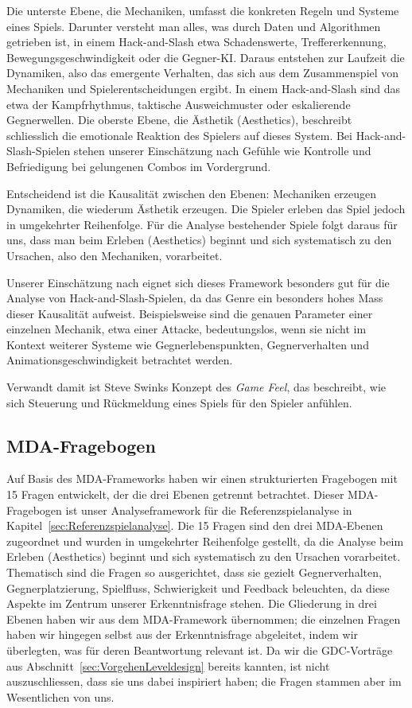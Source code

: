 \documentclass[../Main.tex]{subfiles}
\begin{document}
Die unterste Ebene, die Mechaniken, umfasst die konkreten Regeln und Systeme eines Spiels. Darunter versteht man alles, was durch Daten und Algorithmen getrieben ist, in einem Hack-and-Slash etwa Schadenswerte, Treffererkennung, Bewegungsgeschwindigkeit oder die Gegner-KI. Daraus entstehen zur Laufzeit die Dynamiken, also das emergente Verhalten, das sich aus dem Zusammenspiel von Mechaniken und Spielerentscheidungen ergibt. In einem Hack-and-Slash sind das etwa der Kampfrhythmus, taktische Ausweichmuster oder eskalierende Gegnerwellen. Die oberste Ebene, die Ästhetik (Aesthetics), beschreibt schliesslich die emotionale Reaktion des Spielers auf dieses System.\autocite[2]{hunicke2004mda} Bei Hack-and-Slash-Spielen stehen unserer Einschätzung nach Gefühle wie Kontrolle und Befriedigung bei gelungenen Combos im Vordergrund.

Entscheidend ist die Kausalität zwischen den Ebenen: Mechaniken erzeugen Dynamiken, die wiederum Ästhetik erzeugen. Die Spieler erleben das Spiel jedoch in umgekehrter Reihenfolge.\autocite[2]{hunicke2004mda} Für die Analyse bestehender Spiele folgt daraus für uns, dass man beim Erleben (Aesthetics) beginnt und sich systematisch zu den Ursachen, also den Mechaniken, vorarbeitet.

Unserer Einschätzung nach eignet sich dieses Framework besonders gut für die Analyse von Hack-and-Slash-Spielen, da das Genre ein besonders hohes Mass dieser Kausalität aufweist. Beispielsweise sind die genauen Parameter einer einzelnen Mechanik, etwa einer Attacke, bedeutungslos, wenn sie nicht im Kontext weiterer Systeme wie Gegnerlebenspunkten, Gegnerverhalten und Animationsgeschwindigkeit betrachtet werden.

Verwandt damit ist Steve Swinks Konzept des \textit{Game Feel}, das beschreibt, wie sich Steuerung und Rückmeldung eines Spiels für den Spieler anfühlen.\autocite[1--6]{swink2008gamefeel}

\subsection{MDA-Fragebogen} \label{sec:Analysefragebogen}

Auf Basis des MDA-Frameworks haben wir einen strukturierten Fragebogen mit 15 Fragen entwickelt, der die drei Ebenen getrennt betrachtet. Dieser MDA-Fragebogen ist unser Analyseframework für die Referenzspielanalyse in Kapitel~\ref{sec:Referenzspielanalyse}. Die 15 Fragen sind den drei MDA-Ebenen zugeordnet und wurden in umgekehrter Reihenfolge gestellt, da die Analyse beim Erleben (Aesthetics) beginnt und sich systematisch zu den Ursachen vorarbeitet. Thematisch sind die Fragen so ausgerichtet, dass sie gezielt Gegnerverhalten, Gegnerplatzierung, Spielfluss, Schwierigkeit und Feedback beleuchten, da diese Aspekte im Zentrum unserer Erkenntnisfrage stehen. Die Gliederung in drei Ebenen haben wir aus dem MDA-Framework übernommen;\autocite{hunicke2004mda} die einzelnen Fragen haben wir hingegen selbst aus der Erkenntnisfrage abgeleitet, indem wir überlegten, was für deren Beantwortung relevant ist. Da wir die GDC-Vorträge aus Abschnitt~\ref{sec:VorgehenLeveldesign} bereits kannten, ist nicht auszuschliessen, dass sie uns dabei inspiriert haben; die Fragen stammen aber im Wesentlichen von uns.
\end{document}
